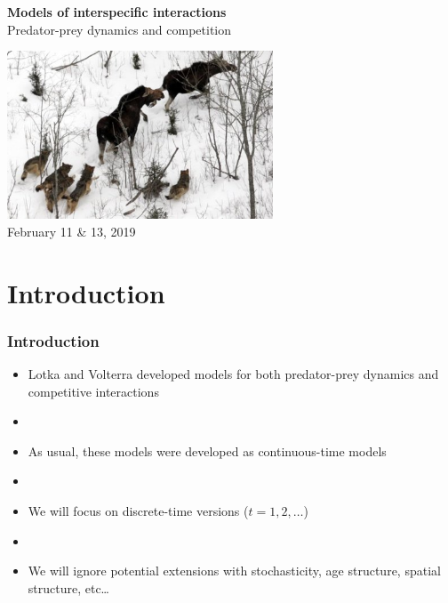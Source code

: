 \documentclass[color=usenames,dvipsnames]{beamer}\usepackage[]{graphicx}\usepackage[]{color}
\begin{document}
\begin{frame}[plain]
  \begin{center}
    {\LARGE {\color{Black} \bf Models of interspecific interactions} \\
      \LARGE {\color{Black} Predator-prey dynamics and
        competition} \par}
    \vspace{0.5cm}
    \vfill
      \includegraphics[height=5cm,keepaspectratio]{figs/isle-royale1} \\
    \vfill
    { \Large February 11 \& 13, 2019} \\
  \end{center}
\end{frame}




\section{Introduction}




\begin{frame}
  \frametitle{Introduction}
  \large
  \begin{itemize}%
    \item<1-> Lotka and Volterra developed models for both predator-prey
      dynamics and competitive interactions
    \item[]
    \item<2-> As usual, these models were developed as
      continuous-time models
    \item[]
    \item<3-> We will focus on discrete-time versions ($t = 1, 2, \ldots$)
    \item[]
    \item<4-> We will ignore potential extensions with stochasticity, age
      structure, spatial structure, etc\dots
  \end{itemize}
\end{frame}
\end{document}
